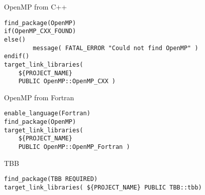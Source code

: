 \begin{numberedframe}{OpenMP from C++}
\begin{lstlisting}
find_package(OpenMP)
if(OpenMP_CXX_FOUND)
else()
        message( FATAL_ERROR "Could not find OpenMP" )
endif()
target_link_libraries(
    ${PROJECT_NAME}
    PUBLIC OpenMP::OpenMP_CXX )
\end{lstlisting}
\end{numberedframe}

\begin{numberedframe}{OpenMP from Fortran}
\begin{lstlisting}
enable_language(Fortran)
find_package(OpenMP)
target_link_libraries(
    ${PROJECT_NAME}
    PUBLIC OpenMP::OpenMP_Fortran )
\end{lstlisting}
\end{numberedframe}


\begin{numberedframe}{TBB}
\begin{lstlisting}
find_package(TBB REQUIRED)
target_link_libraries( ${PROJECT_NAME} PUBLIC TBB::tbb)
\end{lstlisting}
\end{numberedframe}

\endinput

\begin{numberedframe}{MPI from C}
  \tiny
  \lstset{numbers=left,numberstyle=\tiny}
  
\end{numberedframe}

\begin{numberedframe}{MPI from Fortran}
  \tiny
  \lstset{numbers=left,numberstyle=\tiny}
  
\end{numberedframe}

\begin{numberedframe}{OpenMP}
  \lstset{numbers=left,numberstyle=\tiny}
  
\end{numberedframe}

